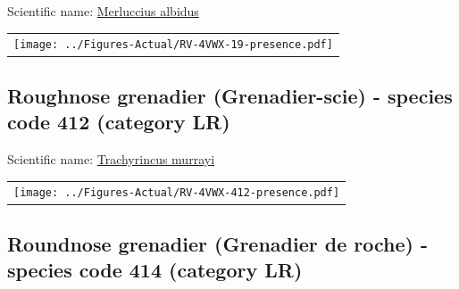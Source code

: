 \documentclass[12pt]{article}\usepackage[]{graphicx}\usepackage[]{color}
\begin{document}

Scientific name: \href{http://www.marinespecies.org/aphia.php?p=taxdetails\&id=158748}{Merluccius albidus} \newline
\begin{minipage}{1.0\textwidth}
 \begin{tabular}{c}
\texttt{[image: ../Figures-Actual/RV-4VWX-19-presence.pdf]} \\ 
\end{tabular} 
\end{minipage}
\clearpage

\renewcommand\thefigure{\thesubsection\Alph{figure}}

\setcounter{figure}{0}

\hypertarget{sec:412}{%
\subsection{Roughnose grenadier (Grenadier-scie) - species code 412 (category LR)}\label{sec:412}}

  


Scientific name: \href{http://www.marinespecies.org/aphia.php?p=taxdetails\&id=126481}{Trachyrincus murrayi} \newline
\begin{minipage}{1.0\textwidth}
 \begin{tabular}{c}
\texttt{[image: ../Figures-Actual/RV-4VWX-412-presence.pdf]} \\ 
\end{tabular} 
\end{minipage}
\clearpage

\renewcommand\thefigure{\thesubsection\Alph{figure}}

\setcounter{figure}{0}

\hypertarget{sec:414}{%
\subsection{Roundnose grenadier (Grenadier de roche) - species code 414 (category LR)}\label{sec:414}}

  
\end{document}
